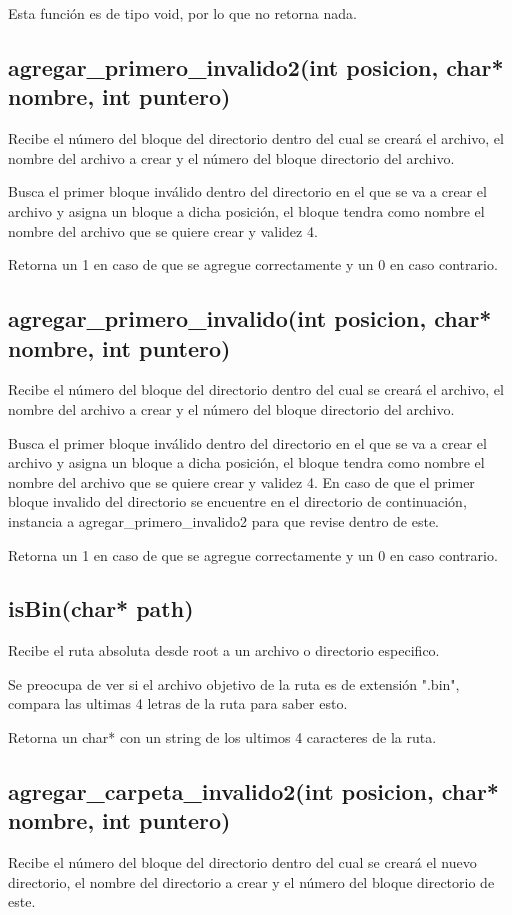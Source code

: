 \documentclass[12pt]{article}
\begin{document}
Esta función es de tipo void, por lo que no retorna nada.

\subsection{agregar\_primero\_invalido2(int posicion, char* nombre, int puntero)}
Recibe el número del bloque del directorio dentro del cual se creará el archivo, el nombre del archivo a crear y el número del bloque directorio del archivo.

Busca el primer bloque inválido dentro del directorio en el que se va a crear el archivo y asigna un bloque a dicha posición, el bloque tendra como nombre el nombre del archivo que se quiere crear y validez 4.

Retorna un 1 en caso de que se agregue correctamente y un 0 en caso contrario.


\subsection{agregar\_primero\_invalido(int posicion, char* nombre, int puntero)}
Recibe el número del bloque del directorio dentro del cual se creará el archivo, el nombre del archivo a crear y el número del bloque directorio del archivo.

Busca el primer bloque inválido dentro del directorio en el que se va a crear el archivo y asigna un bloque a dicha posición, el bloque tendra como nombre el nombre del archivo que se quiere crear y validez 4. En caso de que el primer bloque invalido del directorio se encuentre en el directorio de continuación, instancia a agregar\_primero\_invalido2 para que revise dentro de este.

Retorna un 1 en caso de que se agregue correctamente y un 0 en caso contrario.

\subsection{isBin(char* path)}
Recibe el ruta absoluta desde root a un archivo o directorio especifico.

Se preocupa de ver si el archivo objetivo de la ruta es de extensión ".bin", compara las ultimas 4 letras de la ruta para saber esto.

Retorna un char* con un string de los ultimos 4 caracteres de la ruta.

\subsection{agregar\_carpeta\_invalido2(int posicion, char* nombre, int puntero)}
Recibe el número del bloque del directorio dentro del cual se creará el nuevo directorio, el nombre del directorio a crear y el número del bloque directorio de este.
\end{document}
